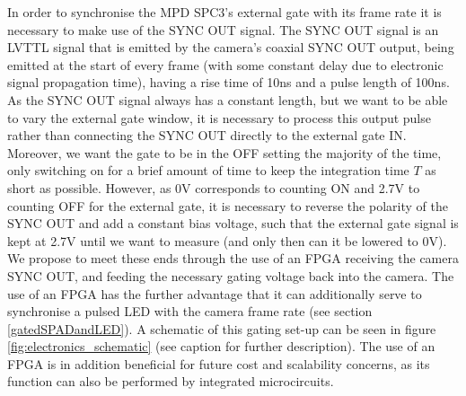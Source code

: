 \documentclass[]{article}
\begin{document}
	In order to synchronise the MPD SPC3's external gate with its frame rate it is necessary to make use of the SYNC OUT signal. The SYNC OUT signal is an LVTTL signal that is emitted by the camera's coaxial SYNC OUT output, being emitted at the start of every frame (with some constant delay due to electronic signal propagation time), having a rise time of 10ns and a pulse length of 100ns. As the SYNC OUT signal always has a constant length, but we want to be able to vary the external gate window, it is necessary to process this output pulse rather than connecting the SYNC OUT directly to the external gate IN. Moreover, we want the gate to be in the OFF setting the majority of the time, only switching on for a brief amount of time to keep the integration time $T$ as short as possible. However, as 0V corresponds to counting ON and 2.7V to counting OFF for the external gate, it is necessary to reverse the polarity of the SYNC OUT and add a constant bias voltage, such that the external gate signal is kept at 2.7V until we want to measure (and only then can it be lowered to 0V). We propose to meet these ends through the use of an FPGA receiving the camera SYNC OUT, and feeding the necessary gating voltage back into the camera. The use of an FPGA has the further advantage that it can additionally serve to synchronise a pulsed LED with the camera frame rate (see section \ref{gatedSPADandLED}). A schematic of this gating set-up can be seen in figure \ref{fig:electronics_schematic} (see caption for further description). The use of an FPGA is in addition beneficial for future cost and scalability concerns, as its function can also be performed by integrated microcircuits.
		
\end{document}
